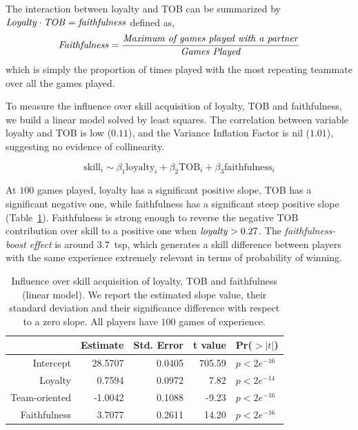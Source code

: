 \documentclass[a4paper,10pt]{book}
\theoremstyle{definition}
\begin{document}
The interaction between loyalty and TOB can be summarized by $ \text{\emph{Loyalty}} \cdot \text{\emph{TOB}} = \text{\emph{faithfulness}}$ defined as,
\begin{equation}
\text{\emph{Faithfulness}} = \frac{\text{\emph{Maximum of games played with a partner}}}{\text{\emph{Games Played}}}
\end{equation}
which is simply the proportion of times played with the most repeating teammate over all the games played.

To measure the influence over skill acquisition of loyalty, TOB and faithfulness, we build a linear model solved by least squares. The correlation between variable loyalty and TOB is low ($0.11$), and the Variance Inflation Factor is nil ($1.01$), suggesting no evidence of collinearity.

\begin{equation}
\text{skill}_i \sim \beta_1\text{loyalty}_i + \beta_2\text{TOB}_i + \beta_3\text{faithfulness}_i
\end{equation}

At $100$ games played, loyalty has a significant positive slope, TOB has a significant negative one, while faithfulness has a significant steep positive slope (Table~\ref{model}).
Faithfulness is strong enough to reverse the negative TOB contribution over skill to a positive one when $\text{\emph{loyalty}}>0.27$.
The \emph{faithfulness-boost effect} is around $3.7$~tsp, which generates a skill difference between players with the same experience extremely relevant in terms of probability of winning.


\begin{table}[ht]
\centering
\begin{tabular}{rrrrl}
  \hline
 & Estimate & Std. Error & t value & Pr($>|t|$) \\ 
  \hline
Intercept & 28.5707 & 0.0405 & 705.59 & $p< 2e^{-16}$ \\ 
  Loyalty & 0.7594 & 0.0972 & 7.82 & $p< 2e^{-14}$ \\ 
  Team-oriented & -1.0042 & 0.1088 & -9.23 & $p< 2e^{-16}$ \\ 
  Faithfulness & 3.7077 & 0.2611 & 14.20 & $p< 2e^{-16}$ \\ 
   \hline
\end{tabular}
\caption{Influence over skill acquisition of loyalty, TOB and faithfulness (linear model). We report the estimated slope value, their standard deviation and their significance difference with respect to a zero slope. All players have $100$ games of experience.}
\label{model}
\end{table}
\end{document}
